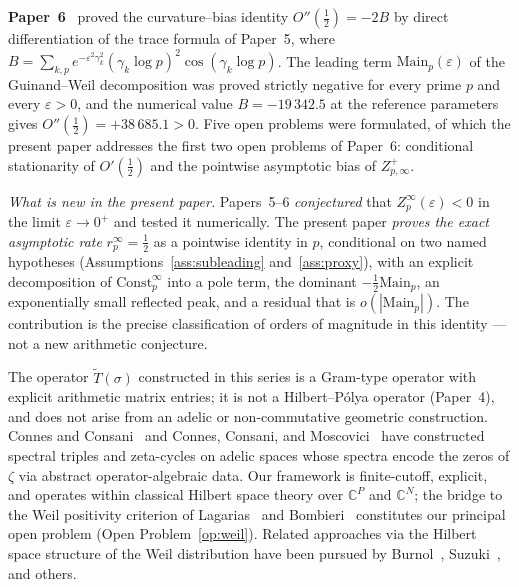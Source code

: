 \documentclass[11pt]{article}
\newcommand{\Tt}{\widetilde{T}}
\begin{document}
\textbf{Paper~6}~\cite{Paper6} proved the curvature--bias identity
$O''(\tfrac12)=-2B$ by direct differentiation of the trace formula of
Paper~5, where
$B=\sum_{k,p}e^{-\varepsilon^2\gamma_k^2}(\gamma_k\log p)^2\cos(\gamma_k\log p)$.
The leading term $\mathrm{Main}_p(\varepsilon)$ of the Guinand--Weil
decomposition was proved strictly negative for every prime $p$ and
every $\varepsilon>0$, and the numerical value $B=-19\,342.5$ at the
reference parameters gives $O''(\tfrac12)=+38\,685.1>0$.
Five open problems were formulated, of which the present paper addresses
the first two open problems of Paper~6:
conditional stationarity of $O'(\tfrac12)$ and the pointwise asymptotic bias of $Z_{p,\infty}^+$.

\smallskip
\noindent\emph{What is new in the present paper.}
Papers~5--6 \emph{conjectured} that $Z_p^\infty(\varepsilon)<0$ in
the limit $\varepsilon\to 0^+$ and tested it numerically.
The present paper \emph{proves the exact asymptotic rate}
$r_p^\infty=\tfrac12$ as a pointwise identity in $p$, conditional on
two named hypotheses (Assumptions~\ref{ass:subleading}
and~\ref{ass:proxy}), with an explicit decomposition of
$\mathrm{Const}_p^\infty$ into a pole term, the dominant
$-\tfrac12\mathrm{Main}_p$, an exponentially small reflected peak,
and a residual that is $o(|\mathrm{Main}_p|)$.
The contribution is the precise classification of orders of magnitude
in this identity --- not a new arithmetic conjecture.

The operator $\Tt(\sigma)$ constructed in this series is a Gram-type
operator with explicit arithmetic matrix entries; it is not a
Hilbert--P\'olya operator (Paper~4), and does not arise from an
adelic or non-commutative geometric construction.
Connes and Consani~\cite{ConnesConsani23} and Connes, Consani, and
Moscovici~\cite{CCM25} have constructed spectral triples and zeta-cycles
on adelic spaces whose spectra encode the zeros of $\zeta$ via abstract
operator-algebraic data.
Our framework is finite-cutoff, explicit, and operates within classical
Hilbert space theory over $\mathbb{C}^P$ and $\mathbb{C}^N$;
the bridge to the Weil positivity criterion of Lagarias~\cite{Lagarias}
and Bombieri~\cite{Bombieri} constitutes our principal open problem
(Open Problem~\ref{op:weil}).
Related approaches via the Hilbert space structure of the Weil
distribution have been pursued by Burnol~\cite{Burnol},
Suzuki~\cite{Suzuki25}, and others.
\end{document}
